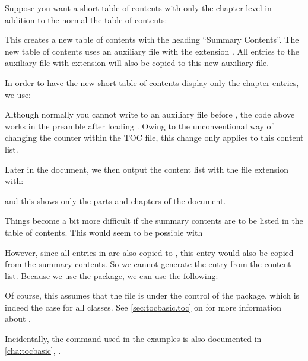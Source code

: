 \begin{Example}
  Suppose you want a short table of contents with only the chapter level in
  addition to the normal the table of contents:
\begin{lstcode}
  \usepackage{scrwfile}
\end{lstcode}
  This creates a new table of contents with the heading ``Summary Contents''.
  The new table of contents uses an auxiliary file with the extension
  . All entries to the auxiliary file with extension 
  will also be copied to this new auxiliary file.

  In order to have the new short table of contents display only the chapter
  entries, we use:
\begin{lstcode}
\end{lstcode}
  Although normally you cannot write to an auxiliary file
  before , the code above works in the
  preamble after loading . Owing to the unconventional way
  of changing the  counter within the TOC
  file, this change only applies to this content list.

  Later in the document, we then output the content list with the file
  extension  with:
\begin{lstcode}[moretexcs={listofsttoc}]
  \listofstoc
\end{lstcode}
  and this shows only the parts and chapters of the document.

  Things become a bit more difficult if the summary contents are to be
  listed in the table of contents. This would seem to be possible with
\begin{lstcode}
\end{lstcode}
However, since all entries in  are also copied to , this
entry would also be copied from the summary contents. So we cannot generate
the entry from the content list. Because we use the
 package, we can use the
following:
\begin{lstcode}
\end{lstcode}
Of course, this assumes that the  file is under the control
of the  package, which is indeed the case for all
\KOMAScript{} classes.  See \autoref{sec:tocbasic.toc} on
 for more information about
.%
\end{Example}
Incidentally, the  command used in the
examples is also documented in \autoref{cha:tocbasic},
.%
\EndIndexGroup


